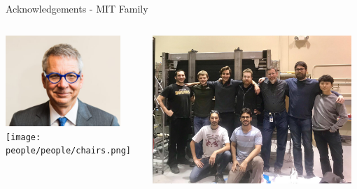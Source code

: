 \documentclass[aspectratio=169]{beamer}
\begin{document}
\begin{frame}{Acknowledgements - MIT Family }
     \begin{columns}
                \centering
                \includegraphics[width=0.865\textwidth]{people/milnergroup/peterfisher.png}
                \texttt{[image: people/people/chairs.png]}

                \centering
                \includegraphics[width=0.965\textwidth]{people/band/band2.jpg}


\end{columns}
\end{frame}
\end{document}
